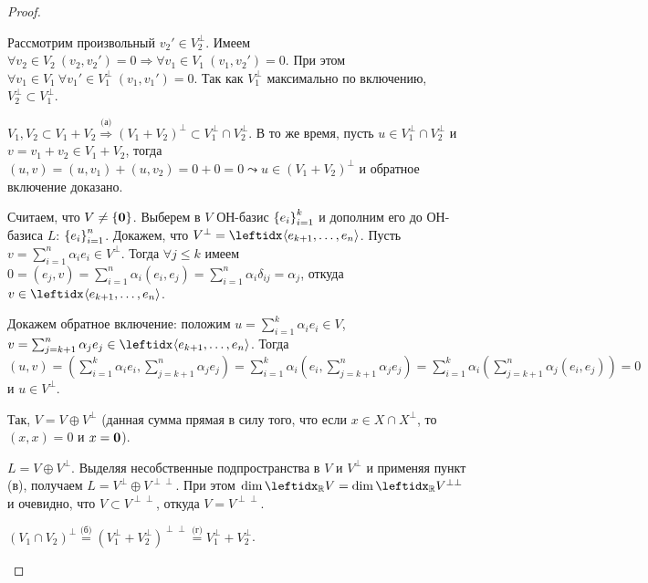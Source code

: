 \begin{proof}
    \begin{proofpart}
        Рассмотрим произвольный $v_2' \in V_2^\perp$. Имеем $\forall v_2 \in V_2\ (v_2, v_2') = 0 \Rightarrow \forall v_1 \in V_1\ (v_1, v_2') = 0$. При этом $\forall v_1 \in V_1\ \forall v_1' \in V_1^\perp\ (v_1, v_1') = 0$. Так как $V_1^\perp$ максимально по включению, $V_2^\perp \subset V_1^\perp$.
    \end{proofpart}

    \begin{proofpart}
        $V_1, V_2 \subset V_1 + V_2 \stackrel{\text{(а)}}{\Rightarrow} (V_1 + V_2)^\perp \subset V_1^\perp \cap V_2^\perp$. В то же время, пусть $u \in V_1^\perp \cap V_2^\perp$ и $v = v_1 + v_2 \in V_1 + V_2$, тогда $(u, v) = (u, v_1) + (u, v_2) = 0 + 0 = 0 \leadsto u \in (V_1 + V_2)^\perp$ и обратное включение доказано.
    \end{proofpart}

    \begin{proofpart}
        Считаем, что $V \neq \{\mathbf{0}\}$. Выберем в $V$ ОН-базис $\left\{e_i\right\}_{i=1}^{k}$ и дополним его до ОН-базиса $L$: $\left\{e_i\right\}_{i=1}^{n}$. Докажем, что $V^\perp = \gen{}{e_{k+1}, \dots, e_n}$. Пусть $v = \sum_{i=1}^n \alpha_i e_i \in V^\perp$. Тогда $\forall j \le k$ имеем $0 = (e_j, v) = \sum_{i=1}^n \alpha_i (e_i, e_j) = \sum_{i=1}^n \alpha_i \delta_{ij} = \alpha_j$, откуда $v \in \gen{}{e_{k+1}, \dots, e_n}$.
        
        Докажем обратное включение: положим $u = \sum_{i=1}^{k} \alpha_i e_i \in V$, $v = \sum_{j=k+1}^n \alpha_j e_j \in \gen{}{e_{k+1}, \dots, e_n}$. Тогда $(u, v) = (\sum_{i=1}^{k} \alpha_i e_i, \sum_{j=k+1}^n \alpha_j e_j) = \sum_{i=1}^{k} \alpha_i (e_i, \sum_{j=k+1}^n \alpha_j e_j) = \sum_{i=1}^{k} \alpha_i (\sum_{j=k+1}^n \alpha_j (e_i, e_j)) = 0$ и $u \in V^\perp$.
        
        Так, $V = V \oplus V^\perp$ (данная сумма прямая в силу того, что если $x \in X \cap X^\perp$, то $(x, x) = 0$ и $x = \mathbf{0}$).
    \end{proofpart}

    \begin{proofpart}
        $L = V \oplus V^\perp$. Выделяя несобственные подпространства в $V$ и $V^\perp$ и применяя пункт (в), получаем $L = V^\perp \oplus V^{\perp\perp}$. При этом $\dim \lsub{\mathbb{R}}{V} = \dim \lsub{\mathbb{R}}{V^{\perp\perp}}$ и очевидно, что $V \subset V^{\perp\perp}$, откуда $V = V^{\perp\perp}$.
    \end{proofpart}

    \begin{proofpart}
        $(V_1 \cap V_2)^\perp \stackrel{\text{(б)}}{=} (V_1^\perp + V_2^\perp)^{\perp\perp} \stackrel{\text{(г)}}{=} V_1^\perp + V_2^\perp$.
    \end{proofpart}
\end{proof}